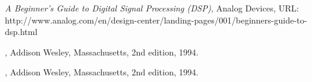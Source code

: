 \documentclass[11pt,a4paper]{article}
\begin{document}
	\begin{thebibliography}{9}

  		
  		\textit{A Beginner's Guide to Digital Signal Processing (DSP)},
  		Analog Devices,
  		URL: http://www.analog.com/en/design-center/landing-pages/001/beginners-guide-to-dsp.html 

	
	\bibitem{}
  		
  		\textit{},
  		Addison Wesley, Massachusetts,
  		2nd edition,
  		1994.
  		
	\bibitem{}
  		
  		\textit{},
  		Addison Wesley, Massachusetts,
  		2nd edition,
  		1994.  		
		
	\end{thebibliography}
\end{document}
